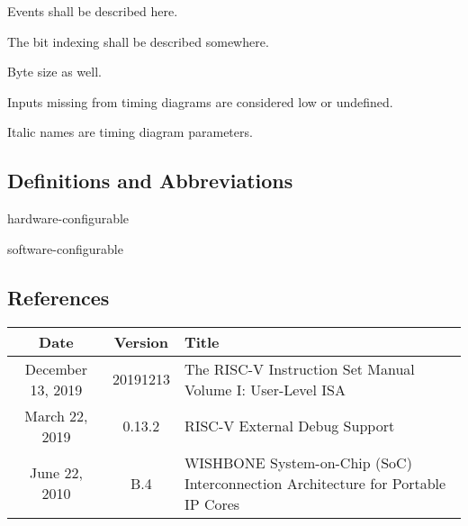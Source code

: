     Events shall be described here.

    The bit indexing shall be described somewhere.

    Byte size as well.

    Inputs missing from timing diagrams are considered low or undefined.

    Italic names are timing diagram parameters.

  \subsection{Definitions and Abbreviations}

    hardware-configurable

    software-configurable

  \subsection{References}

    \begin{center}
      {
        \vspace{0.5em}
        \small
        \begin{tabularx}{0.9\textwidth}{|c|c|X|}
            \hline
            \cellcolor{gray!20}\textbf{Date} & \cellcolor{gray!20}\textbf{Version} & \cellcolor{gray!20}\textbf{Title} \\
            \hline
            December 13, 2019 & 20191213 & The RISC-V Instruction Set Manual Volume I: User-Level ISA \\
            \hline
            March 22, 2019 & 0.13.2 & RISC-V External Debug Support \\
            \hline
            June 22, 2010 & B.4 & WISHBONE System-on-Chip (SoC) Interconnection Architecture for Portable IP Cores \\
            \hline
          \end{tabularx}
        \vspace{0.5em}
      }
      \end{center}

\newpage
